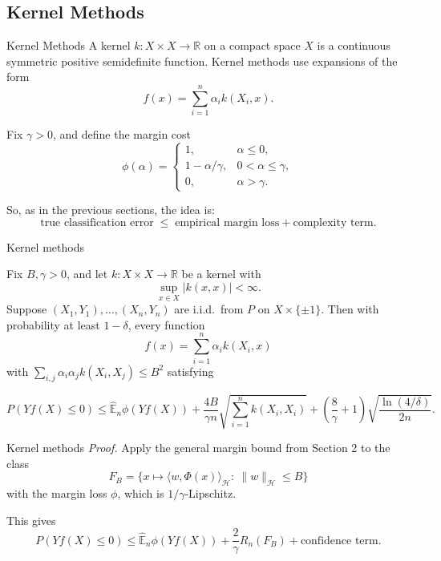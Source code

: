 
\subsection{Kernel Methods}

\begin{frame}{Kernel Methods}
A kernel \(k:X\times X\to \mathbb R\) on a compact space \(X\) is a continuous symmetric positive semidefinite function. Kernel methods use expansions of the form
\[
f(x)=\sum_{i=1}^n \alpha_i k(X_i,x).
\]

Fix \(\gamma>0\), and define the margin cost
\[
\phi(\alpha)=
\begin{cases}
1, & \alpha\le 0,\\[1mm]
1-\alpha/\gamma, & 0<\alpha\le \gamma,\\[1mm]
0, & \alpha>\gamma.
\end{cases}
\]

So, as in the previous sections, the idea is:
\[
\text{true classification error}
\;\le\;
\text{empirical margin loss}
+
\text{complexity term}.
\]

\end{frame}

\begin{frame}{Kernel methods}
        \begin{mytheorem}
        \label{theorem:kernel-bound}
        Fix \(B,\gamma>0\), and let \(k:X\times X\to\mathbb R\) be a kernel with
\[
\sup_{x\in X}|k(x,x)|<\infty.
\]
Suppose \((X_1,Y_1),\dots,(X_n,Y_n)\) are i.i.d.\ from \(P\) on \(X\times\{\pm1\}\).
Then with probability at least \(1-\delta\), every function
\[
f(x)=\sum_{i=1}^n \alpha_i k(X_i,x)
\]
with $\sum_{i,j}\alpha_i\alpha_j k(X_i,X_j)\le B^2$ satisfying

\[
P(Yf(X)\le 0)
\le
\hat{\mathbb E}_n\phi(Yf(X))
+
\frac{4B}{\gamma n}\sqrt{\sum_{i=1}^n k(X_i,X_i)}
+
\left(\frac{8}{\gamma}+1\right)\sqrt{\frac{\ln(4/\delta)}{2n}}.
\]

    \end{mytheorem}
\end{frame}

\begin{frame}{Kernel methods}
\textit{Proof. } Apply the general margin bound from Section 2 to the class
\[
F_B=\{x\mapsto \langle w,\Phi(x)\rangle_{\mathcal H}:\ \|w\|_{\mathcal H}\le B\}
\]
with the margin loss \(\phi\), which is \(1/\gamma\)-Lipschitz.

\medskip
This gives
\[
P(Yf(X)\le 0)
\le
\hat{\mathbb E}_n\phi(Yf(X))
+
\frac{2}{\gamma}R_n(F_B)
+
\text{confidence term}.
\]
\end{frame}

